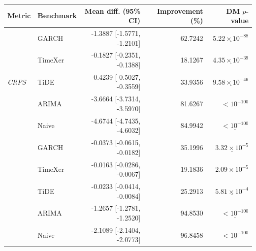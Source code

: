 \begin{tabular}{llrrr}
\toprule
Metric & Benchmark & Mean diff. (95\% CI) & Improvement (\%) & DM $p$-value \\
\midrule
\multirow{5}{*}{\textit{CRPS}}
 & GARCH & -1.3887 [-1.5771, -1.2101] & 62.7242 & $\underline{5.22 \times 10^{-88}}$ \\
 & TimeXer & -0.1827 [-0.2351, -0.1388] & 18.1267 & $\underline{4.35 \times 10^{-39}}$ \\
 & TiDE & -0.4239 [-0.5027, -0.3559] & 33.9356 & $\underline{9.58 \times 10^{-46}}$ \\
 & ARIMA & -3.6664 [-3.7314, -3.5970] & 81.6267 & $\underline{< 10^{-100}}$ \\
 & Naive & -4.6744 [-4.7435, -4.6032] & 84.9942 & $\underline{< 10^{-100}}$ \\
\addlinespace \midrule
\multirow{5}{*}{\textit{twCRPS}}
 & GARCH & -0.0373 [-0.0615, -0.0182] & 35.1996 & $\underline{3.32 \times 10^{-5}}$ \\
 & TimeXer & -0.0163 [-0.0286, -0.0067] & 19.1836 & $\underline{2.09 \times 10^{-5}}$ \\
 & TiDE & -0.0233 [-0.0414, -0.0084] & 25.2913 & $\underline{5.81 \times 10^{-4}}$ \\
 & ARIMA & -1.2657 [-1.2781, -1.2520] & 94.8530 & $\underline{< 10^{-100}}$ \\
 & Naive & -2.1089 [-2.1404, -2.0773] & 96.8458 & $\underline{< 10^{-100}}$ \\
\bottomrule
\end{tabular}